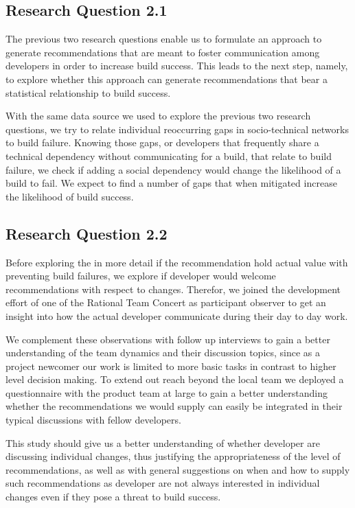 \subsection{Research Question 2.1}
The previous two research questions enable us to formulate an approach to generate recommendations that are meant to foster communication among developers in order to increase build success.
This leads to the next step, namely, to explore whether this approach can generate recommendations that bear a statistical relationship to build success.

With the same data source we used to explore the previous two research questions, we try to relate individual reoccurring gaps in socio-technical networks to build failure.
Knowing those gaps, or developers that frequently share a technical dependency without communicating for a build, that relate to build failure, we check if adding a social dependency would change the likelihood of a build to fail.
We expect to find a number of gaps that when mitigated increase the likelihood of build success.

\subsection{Research Question 2.2}
Before exploring the in more detail if the recommendation hold actual value with preventing build failures, we explore if developer would welcome recommendations with respect to changes.
Therefor, we joined the development effort of one of the Rational Team Concert as participant observer to get an insight into how the actual developer communicate during their day to day work.

We complement these observations with follow up interviews to gain a better understanding of the team dynamics and their discussion topics, since as a project newcomer our work is limited to more basic tasks in contrast to higher level decision making.
To extend out reach beyond the local team we deployed a questionnaire with the product team at large to gain a better understanding whether the recommendations we would supply can easily be integrated in their typical discussions with fellow developers.

This study should give us a better understanding of whether developer are discussing individual changes, thus justifying the appropriateness of the level of recommendations, as well as with general suggestions on when and how to supply such recommendations as developer are not always interested in individual changes even if they pose a threat to build success.

